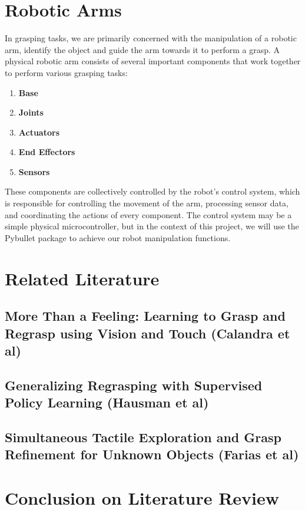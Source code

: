 \documentclass[12pt, a4paper]{report}
\theoremstyle{definition}
\begin{document}
\section{Robotic Arms}
In grasping tasks, we are primarily concerned with the manipulation of a robotic arm, identify the object and guide the arm towards it to perform a grasp. A physical robotic arm consists of several important components that work together to perform various grasping tasks:
\begin{enumerate}
    \item \textbf{Base}
    \item \textbf{Joints}
    \item \textbf{Actuators}
    \item \textbf{End Effectors}
    \item \textbf{Sensors}
\end{enumerate}

These components are collectively controlled by the robot's control system, which is responsible for controlling the movement of the arm, processing sensor data, and coordinating the actions of every component. The control system may be a simple physical microcontroller, but in the context of this project, we will use the Pybullet \cite{pybullet} package to achieve our robot manipulation functions.

\section{Related Literature}
\label{sec:2.3}
\subsection{More Than a Feeling: Learning to Grasp and Regrasp using Vision and Touch (Calandra et al)\cite{calandra}}
\label{sec:2.3.1}


\subsection{Generalizing Regrasping with Supervised Policy Learning (Hausman et al)\cite{hausman}}
\label{sec:2.3.2}


\subsection{Simultaneous Tactile Exploration and Grasp Refinement for Unknown Objects (Farias et al)\cite{farias}}
\label{sec:2.3.3}


\section{Conclusion on Literature Review}
\label{sec:2.4}
\end{document}
